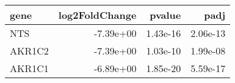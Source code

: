 \begin{tabular}{lrrr}
\toprule
  gene &  log2FoldChange &   pvalue &     padj \\
\midrule
   NTS &       -7.39e+00 & 1.43e-16 & 2.06e-13 \\
AKR1C2 &       -7.39e+00 & 1.03e-10 & 1.99e-08 \\
AKR1C1 &       -6.89e+00 & 1.85e-20 & 5.59e-17 \\
\bottomrule
\end{tabular}
